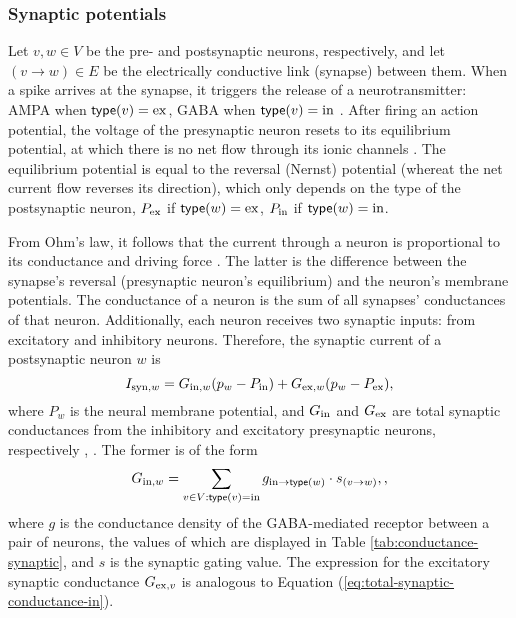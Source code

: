 \subsubsection{Synaptic potentials}
\label{sec:synaptic-potentials}

Let $v, w \in V$ be the pre- and postsynaptic neurons, respectively, and let $(v \to w) \in E$ be the electrically conductive link (synapse) between them. When a spike arrives at the synapse, it triggers the release of a neurotransmitter: AMPA when $\mathsf{type}(v) = \mathrm{ex}$, GABA when $\mathsf{type}(v) = \mathrm{in}$ \cite{Lowet2015}. After firing an action potential, the voltage of the presynaptic neuron resets to its equilibrium potential, at which there is no net flow through its ionic channels \cite{JohnsBook2014:6}. The equilibrium potential is equal to the reversal (Nernst) potential (whereat the net current flow reverses its direction), which only depends on the type of the postsynaptic neuron, $P_{\mathrm{ex}}$ if $\mathsf{type}(w) = \mathrm{ex}$, $P_{\mathrm{in}}$ if $\mathsf{type}(w) = \mathrm{in}$. 

From Ohm's law, it follows that the current through a neuron is proportional to its conductance and driving force \cite{KandelBook2003:6}. The latter is the difference between the synapse's reversal (presynaptic neuron's equilibrium) and the neuron's membrane potentials. The conductance of a neuron is the sum of all synapses' conductances of that neuron. Additionally, each neuron receives two synaptic inputs: from excitatory and inhibitory neurons. Therefore, the synaptic current of a postsynaptic neuron $w$ is
\begin{equation}
    I_{\mathrm{syn}, w} = G_{\mathrm{in}, w} (p_{w} - P_{\mathrm{in}}) + G_{\mathrm{ex}, w} (p_{w} - P_{\mathrm{ex}}),
    \label{eq:synaptic-current}
\end{equation}
where $P_w$ is the neural membrane potential, and $G_{\mathrm{in}}$ and $G_{\mathrm{ex}}$ are total synaptic conductances from the inhibitory and excitatory presynaptic neurons, respectively \cite{Lowet2015}, \cite{Jensen2005}. The former is of the form 
\begin{equation}
    G_{\mathrm{in}, w} = \sum_{v \in V: \mathsf{type}(v) = \mathrm{in}} g_{\mathrm{in} \to \mathsf{type}(w)} \cdot s_{(v \to w)},
    \label{eq:total-synaptic-conductance-in},
\end{equation}
where $g$ is the conductance density of the GABA-mediated receptor between a pair of neurons, the values of which are displayed in Table \ref{tab:conductance-synaptic}, and $s$ is the synaptic gating value. The expression for the excitatory synaptic conductance $G_{\mathrm{ex}, v}$ is analogous to Equation (\ref{eq:total-synaptic-conductance-in}).

